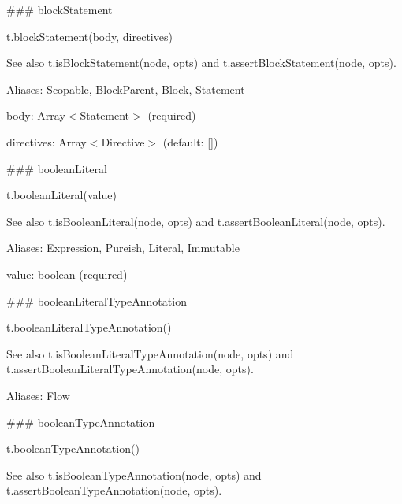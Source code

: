 \#\#\# block\+Statement 
\begin{DoxyCode}
t.blockStatement(body, directives)
\end{DoxyCode}


See also {\ttfamily t.\+is\+Block\+Statement(node, opts)} and {\ttfamily t.\+assert\+Block\+Statement(node, opts)}.

Aliases\+: {\ttfamily Scopable}, {\ttfamily Block\+Parent}, {\ttfamily Block}, {\ttfamily Statement}


\begin{DoxyItemize}
\item {\ttfamily body}\+: {\ttfamily Array$<$Statement$>$} (required)
\item {\ttfamily directives}\+: {\ttfamily Array$<$Directive$>$} (default\+: {\ttfamily \mbox{[}\mbox{]}}) 


\end{DoxyItemize}

\#\#\# boolean\+Literal 
\begin{DoxyCode}
t.booleanLiteral(value)
\end{DoxyCode}


See also {\ttfamily t.\+is\+Boolean\+Literal(node, opts)} and {\ttfamily t.\+assert\+Boolean\+Literal(node, opts)}.

Aliases\+: {\ttfamily Expression}, {\ttfamily Pureish}, {\ttfamily Literal}, {\ttfamily Immutable}


\begin{DoxyItemize}
\item {\ttfamily value}\+: {\ttfamily boolean} (required) 


\end{DoxyItemize}

\#\#\# boolean\+Literal\+Type\+Annotation 
\begin{DoxyCode}
t.booleanLiteralTypeAnnotation()
\end{DoxyCode}


See also {\ttfamily t.\+is\+Boolean\+Literal\+Type\+Annotation(node, opts)} and {\ttfamily t.\+assert\+Boolean\+Literal\+Type\+Annotation(node, opts)}.

Aliases\+: {\ttfamily Flow}





\#\#\# boolean\+Type\+Annotation 
\begin{DoxyCode}
t.booleanTypeAnnotation()
\end{DoxyCode}


See also {\ttfamily t.\+is\+Boolean\+Type\+Annotation(node, opts)} and {\ttfamily t.\+assert\+Boolean\+Type\+Annotation(node, opts)}.


